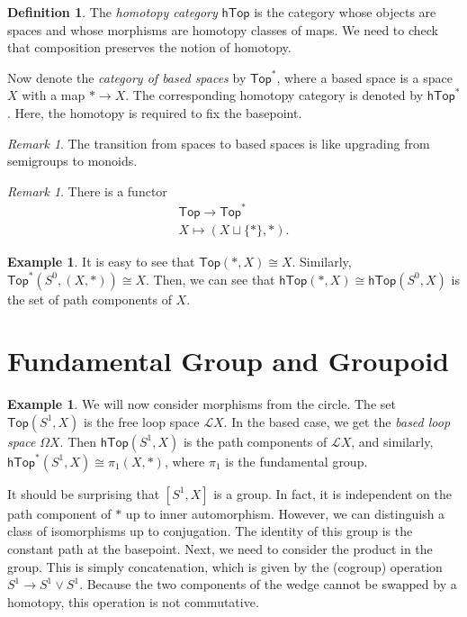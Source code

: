 \documentclass[leqno, openany]{memoir}
\theoremstyle{definition}
\newtheorem{defn}[thm]{Definition}
\newtheorem{exm}[thm]{Example}
\theoremstyle{remark}
\newtheorem{rmk}[thm]{Remark}
\theoremstyle{plain}
\theoremstyle{definition}
\theoremstyle{remark}
\newcommand{\mc}[1]{\mathcal{#1}}
\newcommand{\ms}[1]{\mathsf{#1}}
\begin{document}
\begin{defn}
The \textit{homotopy category} $\ms{hTop}$ is the category whose objects are spaces and whose morphisms are homotopy classes of maps. We need to check that composition preserves the notion of homotopy.
\end{defn}

Now denote the \textit{category of based spaces} by $\ms{Top}^*$, where a based space is a space $X$ with a map $* \to X$. The corresponding homotopy category is denoted by $\ms{hTop}^*$. Here, the homotopy is required to fix the basepoint.

\begin{rmk}
    The transition from spaces to based spaces is like upgrading from semigroups to monoids.
\end{rmk}

\begin{rmk}
    There is a functor 
    \begin{align*}
        \ms{Top} \to \ms{Top}^* \\
        X \mapsto (X \sqcup \{*\}, *).
    \end{align*}
\end{rmk}

\begin{exm}
    It is easy to see that $\ms{Top}(*,X) \cong X$. Similarly, $\ms{Top}^*(S^0,(X,*)) \cong X$. Then, we can see that $\ms{hTop}(*,X) \cong \ms{hTop}(S^0,X)$ is the set of path components of $X$.
\end{exm}

\section{Fundamental Group and Groupoid}%
\label{sec:fundamental_group_and_groupoid}

\begin{exm}
    We will now consider morphisms from the circle. The set $\ms{Top}(S^1,X)$ is the free loop space $\mc{L}X$. In the based case, we get the \textit{based loop space} $\Omega X$. Then $\ms{hTop}(S^1,X)$ is the path components of $\mc{L}X$, and similarly, $\ms{hTop}^*(S^1,X) \cong \pi_1(X,*)$, where $\pi_1$ is the fundamental group.
\end{exm}

It should be surprising that $[S^1,X]$ is a group. In fact, it is independent on the path component of $*$ up to inner automorphism. However, we can distinguish a class of isomorphisms up to conjugation. The identity of this group is the constant path at the basepoint. Next, we need to consider the product in the group. This is simply concatenation, which is given by the (cogroup) operation $S^1 \to S^1 \vee S^1$. Because the two components of the wedge cannot be swapped by a homotopy, this operation is not commutative.
\end{document}
